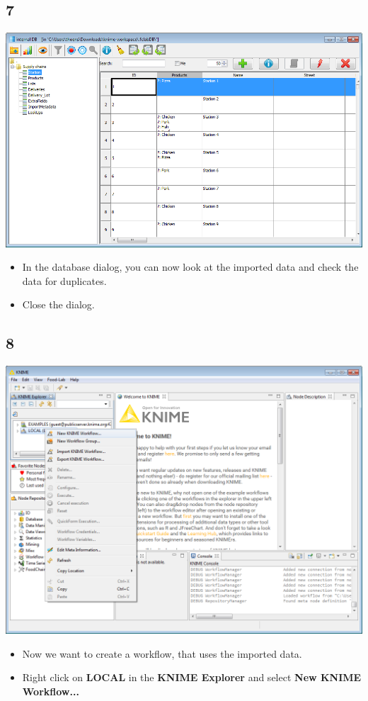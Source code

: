 \documentclass{beamer}
\begin{document}
\subsection{7}
\begin{frame}
	\begin{center}
  		\includegraphics[height=0.6\textheight]{7.png}
	\end{center}
	\begin{itemize}
		\item In the database dialog, you can now look at the imported data and check the data for duplicates.
		\item Close the dialog.
	\end{itemize}
\end{frame}

\subsection{8}
\begin{frame}
	\begin{center}
  		\includegraphics[height=0.6\textheight]{8.png}
	\end{center}
	\begin{itemize}
		\item Now we want to create a workflow, that uses the imported data.
		\item Right click on \textbf{LOCAL} in the \textbf{KNIME Explorer} and select \textbf{New KNIME Workflow...}
	\end{itemize}
\end{frame}
\end{document}

